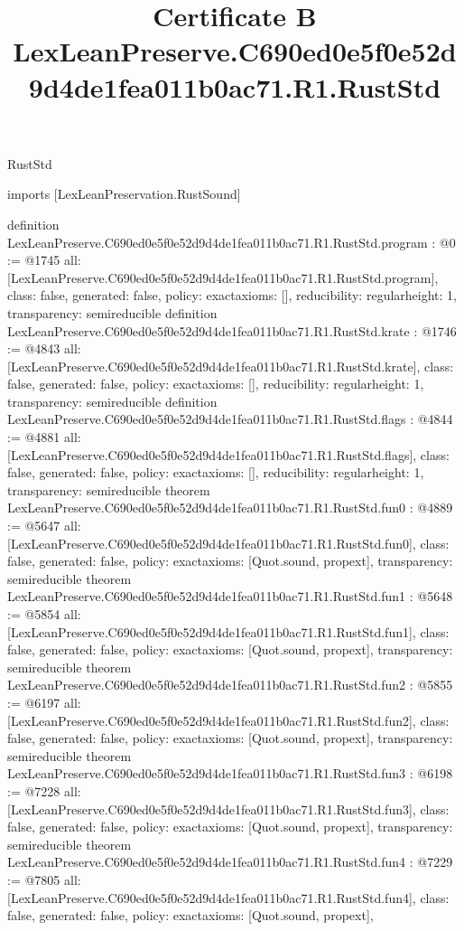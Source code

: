 \begin{lexlean}{RustStd}
\title{Certificate B LexLeanPreserve.C690ed0e5f0e52d9d4de1fea011b0ac71.R1.RustStd}
\begin{coremodule}
imports [LexLeanPreservation.RustSound]

definition LexLeanPreserve.C690ed0e5f0e52d9d4de1fea011b0ac71.R1.RustStd.program : @0 := @1745 {
  all: [LexLeanPreserve.C690ed0e5f0e52d9d4de1fea011b0ac71.R1.RustStd.program],
  class: false,
  generated: false,
  policy: exact{axioms: []},
  reducibility: regular{height: 1},
  transparency: semireducible
}
definition LexLeanPreserve.C690ed0e5f0e52d9d4de1fea011b0ac71.R1.RustStd.krate : @1746 := @4843 {
  all: [LexLeanPreserve.C690ed0e5f0e52d9d4de1fea011b0ac71.R1.RustStd.krate],
  class: false,
  generated: false,
  policy: exact{axioms: []},
  reducibility: regular{height: 1},
  transparency: semireducible
}
definition LexLeanPreserve.C690ed0e5f0e52d9d4de1fea011b0ac71.R1.RustStd.flags : @4844 := @4881 {
  all: [LexLeanPreserve.C690ed0e5f0e52d9d4de1fea011b0ac71.R1.RustStd.flags],
  class: false,
  generated: false,
  policy: exact{axioms: []},
  reducibility: regular{height: 1},
  transparency: semireducible
}
theorem LexLeanPreserve.C690ed0e5f0e52d9d4de1fea011b0ac71.R1.RustStd.fun0 : @4889 := @5647 {
  all: [LexLeanPreserve.C690ed0e5f0e52d9d4de1fea011b0ac71.R1.RustStd.fun0],
  class: false,
  generated: false,
  policy: exact{axioms: [Quot.sound, propext]},
  transparency: semireducible
}
theorem LexLeanPreserve.C690ed0e5f0e52d9d4de1fea011b0ac71.R1.RustStd.fun1 : @5648 := @5854 {
  all: [LexLeanPreserve.C690ed0e5f0e52d9d4de1fea011b0ac71.R1.RustStd.fun1],
  class: false,
  generated: false,
  policy: exact{axioms: [Quot.sound, propext]},
  transparency: semireducible
}
theorem LexLeanPreserve.C690ed0e5f0e52d9d4de1fea011b0ac71.R1.RustStd.fun2 : @5855 := @6197 {
  all: [LexLeanPreserve.C690ed0e5f0e52d9d4de1fea011b0ac71.R1.RustStd.fun2],
  class: false,
  generated: false,
  policy: exact{axioms: [Quot.sound, propext]},
  transparency: semireducible
}
theorem LexLeanPreserve.C690ed0e5f0e52d9d4de1fea011b0ac71.R1.RustStd.fun3 : @6198 := @7228 {
  all: [LexLeanPreserve.C690ed0e5f0e52d9d4de1fea011b0ac71.R1.RustStd.fun3],
  class: false,
  generated: false,
  policy: exact{axioms: [Quot.sound, propext]},
  transparency: semireducible
}
theorem LexLeanPreserve.C690ed0e5f0e52d9d4de1fea011b0ac71.R1.RustStd.fun4 : @7229 := @7805 {
  all: [LexLeanPreserve.C690ed0e5f0e52d9d4de1fea011b0ac71.R1.RustStd.fun4],
  class: false,
  generated: false,
  policy: exact{axioms: [Quot.sound, propext]},
}
\end{coremodule}
\end{lexlean}

